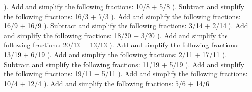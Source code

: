 \documentclass{article}%
\begin{document}
\newline%
). Add and simplify the following fractions: 10/8 + 5/8%
\newline%
\newline%
). Subtract and simplify the following fractions: 16/3 + 7/3%
\newline%
\newline%
). Add and simplify the following fractions: 16/9 + 16/9%
\newline%
\newline%
). Subtract and simplify the following fractions: 3/14 + 2/14%
\newline%
\newline%
). Add and simplify the following fractions: 18/20 + 3/20%
\newline%
\newline%
). Add and simplify the following fractions: 20/13 + 13/13%
\newline%
\newline%
). Add and simplify the following fractions: 13/19 + 6/19%
\newline%
\newline%
). Add and simplify the following fractions: 2/11 + 17/11%
\newline%
\newline%
). Subtract and simplify the following fractions: 11/19 + 5/19%
\newline%
\newline%
). Add and simplify the following fractions: 19/11 + 5/11%
\newline%
\newline%
). Add and simplify the following fractions: 10/4 + 12/4%
\newline%
\newline%
). Add and simplify the following fractions: 6/6 + 14/6%
\newline%
\newline%
\newline%
\end{document}

